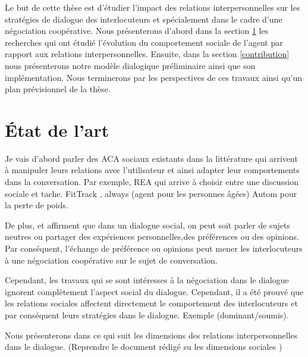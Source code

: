 \documentclass[a4paper,french]{article}
\begin{document}
\par Le but de cette thèse est d'étudier l'impact des relations interpersonnelles sur les stratégies de dialogue des interlocuteurs et spécialement dans le cadre d'une négociation coopérative. Nous présenterons d'abord dans la section \ref{RW} les recherches qui ont étudié l'évolution du comportement sociale de l'agent par rapport aux relations interpersonnelles. Ensuite, dans la section \ref{contribution} nous présenterons notre modèle dialogique préliminaire ainsi que son implémentation. Nous terminerons par les perspectives de ces travaux ainsi qu'un plan prévisionnel de la thèse.

\section{État de l'art}
\label{RW}
Je vais d'abord parler des ACA sociaux existants dans la littérature qui arrivent à manipuler leurs relations avec l'utilisateur et ainsi adapter leur comportements dans la conversation. Par exemple, REA qui arrive à choisir entre une discussion sociale et tache.
FitTrack \cite{bickmore2005s}, always \cite{sidner2013always}(agent pour les personnes âgées)
Autom pour la perte de poids.

De plus, \cite{bickmore2005social}  et \cite{laver1981linguistic} affirment que dans un dialogue social, on peut soit parler de sujets neutres ou partager des expériences personnelles,des préférences ou des opinions. Par conséquent, l’échange de préférence ou opinions peut mener les interlocuteurs à une négociation coopérative sur le sujet de conversation.


Cependant, les travaux qui se sont intéresses à la négociation \cite{amgoud2000arguments,mcburney2004denotational,daskalopulu1998handling} dans le dialogue ignorent complètement l'aspect social du dialogue. Cependant, il a été prouvé que les relations sociales affectent directement le comportement des interlocuteurs \cite{bickmore2000weather, bickmore2005establishing, moon1998intimate, nass2000does} et par conséquent leurs stratégies dans le dialogue. 
Exemple (dominant/soumis). 

Nous présenterons dans ce qui suit les dimensions des relations interpersonnelles dans le dialogue. 
(Reprendre le document rédigé su les dimensions sociales \cite {svennevig2000getting, haslam1994mental})
\end{document}
